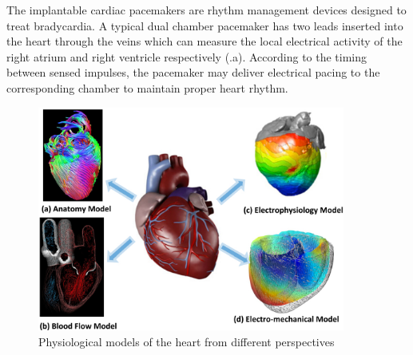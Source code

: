 The implantable cardiac pacemakers are rhythm management devices designed to treat bradycardia. A typical dual chamber pacemaker has two leads inserted into the heart through the veins which can measure the local electrical activity of the right atrium and right ventricle respectively (.a). According to the timing between sensed impulses, the pacemaker may deliver electrical pacing to the corresponding chamber to maintain proper heart rhythm.

\begin{figure}[!t]
\centering
		\includegraphics[width=0.9\textwidth]{figs/models.pdf}
		
\caption{\small Physiological models of the heart from different perspectives}
\label{fig:models}
\end{figure} 
